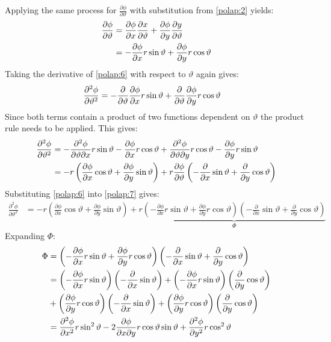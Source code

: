 \documentclass[a4paper,12pt]{article}
\renewcommand{\theta}{\vartheta}      		%
\newcommand{\partialder}[2]{\frac{\partial #1}{\partial #2}}        %
\begin{document}
Applying the same process for $\partialder{\phi}{\theta}$ with substitution from \ref{polap:2} yields:
\begin{align}
	\notag\partialder{\phi}{\theta}&=\partialder{\phi}{x}\partialder{x}{\theta}+\partialder{\phi}{y}\partialder{y}{\theta}\\
	\label{polap:6}&=-\partialder{\phi}{x}r\sin\theta+\partialder{\phi}{y}r\cos\theta
\end{align}
Taking the derivative of \ref{polap:6} with respect to $\theta$ again gives:
\begin{align}
	\notag\frac{\partial^2\phi}{\partial\theta^2}&=-\partialder{}{\theta}\partialder{\phi}{x}r\sin\theta+\partialder{}{\theta}\partialder{\phi}{y}r\cos\theta
\end{align}
Since both terms contain a product of two functions dependent on $\theta$ the product rule needs to be applied. This gives:
\begin{align}
	\notag\frac{\partial^2\phi}{\partial\theta^2}&=-\frac{\partial^2\phi}{\partial\theta\partial x}r\sin\theta-\partialder{\phi}{x}r\cos\theta+\frac{\partial^2\phi}{\partial\theta\partial y}r\cos\theta-\partialder{\phi}{y}r\sin\theta\\
	\label{polap:7}&=-r\left(\partialder{\phi}{x}\cos\theta+\partialder{\phi}{y}\sin\theta\right)+r\partialder{\phi}{\theta}\left(-\partialder{}{x}\sin\theta+\partialder{}{y}\cos\theta\right)
\end{align}
Substituting \ref{polap:6} into \ref{polap:7} gives:
\begin{align}
	\label{polap:8}\frac{\partial^2\phi}{\partial\theta^2}&=-r\left(\partialder{\phi}{x}\cos\theta+\partialder{\phi}{y}\sin\theta\right)+r\underbrace{\left(-\partialder{\phi}{x}r\sin\theta+\partialder{\phi}{y}r\cos\theta\right)\left(-\partialder{}{x}\sin\theta+\partialder{}{y}\cos\theta\right)}_{\Phi}
\end{align}
Expanding $\Phi$:
\begin{align}
	\notag\Phi&=\left(-\partialder{\phi}{x}r\sin\theta+\partialder{\phi}{y}r\cos\theta\right)\left(-\partialder{}{x}\sin\theta+\partialder{}{y}\cos\theta\right)\\
	\notag&=\left(-\partialder{\phi}{x}r\sin\theta\right)\left(-\partialder{}{x}\sin\theta\right)+\left(-\partialder{\phi}{x}r\sin\theta\right)\left(\partialder{}{y}\cos\theta\right)\\
	\notag&+\left(\partialder{\phi}{y}r\cos\theta\right)\left(-\partialder{}{x}\sin\theta\right)+\left(\partialder{\phi}{y}r\cos\theta\right)\left(\partialder{}{y}\cos\theta\right)\\
	\notag&=\frac{\partial^2\phi}{\partial x^2}r\sin^2\theta-2\frac{\partial\phi}{\partial x\partial y}r\cos\theta\sin\theta+\frac{\partial^2\phi}{\partial y^2}r\cos^2\theta
\end{align}
\end{document}
